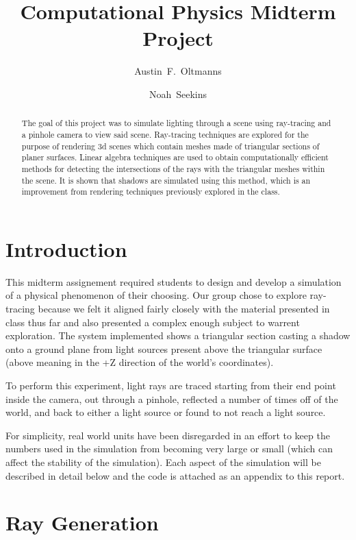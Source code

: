 \documentclass{article}
\begin{document}
\title{Computational Physics Midterm Project}
\author{
Austin~F.~Oltmanns
\and
Noah~Seekins
}

\maketitle

\begin{abstract}
The goal of this project was to simulate lighting through a scene using ray-tracing and a pinhole camera to view said scene.
Ray-tracing techniques are explored for the purpose of rendering 3d scenes which contain meshes made of
triangular sections of planer surfaces. Linear algebra techniques are used to obtain computationally 
efficient methods  for detecting the intersections of the rays with the triangular meshes within the scene.
It is shown that shadows are simulated using this method, which is an improvement 
from rendering techniques previously explored in the class.
\end{abstract} 

\section{Introduction}
This midterm assignement required students to design and develop a simulation of a physical phenomenon 
of their choosing. Our group chose to explore ray-tracing because we felt it aligned fairly closely with the 
material presented in class thus far and also presented a complex enough subject to warrent exploration.
The system implemented shows a triangular section casting a shadow onto a ground plane from light sources
present above the triangular surface (above meaning in the +Z direction of the world's coordinates).

To perform this experiment, light rays are traced starting from their end point inside the camera, out through
a pinhole, reflected a number of times off of the world, and back to either a light source or found to not 
reach a light source.

For simplicity, real world units have been disregarded in an effort to keep the numbers used in the simulation from 
becoming very large or small (which can affect the stability of the simulation).
Each aspect of the simulation will be described in detail below and the code is attached as an appendix to this report.

\section{Ray Generation}
\end{document}
